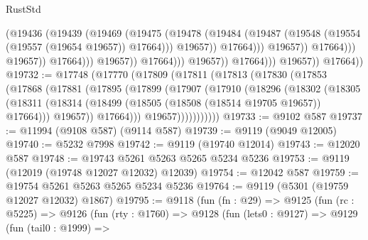 \begin{lexlean}{RustStd}
\begin{coremodule}
                                                  (@19436
                                                    (@19439
                                                      (@19469
                                                        (@19475
                                                          (@19478
                                                            (@19484
                                                              (@19487
                                                                (@19548
                                                                  (@19554
                                                                    (@19557 (@19654 @19657))
                                                                    @17664)))
                                                              @19657))
                                                          @17664)))
                                                    @19657))
                                                @17664)))
                                          @19657))
                                      @17664)))
                                @19657))
                            @17664)))
                      @19657))
                  @17664)))
            @19657))
        @17664))
@19732 := @17748
    (@17770
      (@17809
        (@17811
          (@17813
            (@17830
              (@17853
                (@17868
                  (@17881
                    (@17895
                      (@17899
                        (@17907
                          (@17910
                            (@18296
                              (@18302
                                (@18305
                                  (@18311
                                    (@18314
                                      (@18499 (@18505 (@18508 (@18514 @19705 @19657)) @17664)))
                                    @19657))
                                @17664)))
                          @19657)))))))))))
@19733 := @9102 @587
@19737 := @11994 (@9108 @587) (@9114 @587)
@19739 := @9119 (@9049 @12005)
@19740 := @5232 @7998
@19742 := @9119 (@19740 @12014)
@19743 := @12020 @587
@19748 := @19743 @5261 @5263 @5265 @5234 @5236
@19753 := @9119 (@12019 (@19748 @12027 @12032) @12039)
@19754 := @12042 @587
@19759 := @19754 @5261 @5263 @5265 @5234 @5236
@19764 := @9119 (@5301 (@19759 @12027 @12032) @1867)
@19795 := @9118
    (fun (fn : @29) =>
    @9125
      (fun (rc : @5225) =>
      @9126
        (fun (rty : @1760) =>
        @9128
          (fun (lets0 : @9127) =>
          @9129
            (fun (tail0 : @1999) =>

\end{coremodule}
\end{lexlean}

